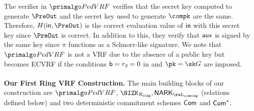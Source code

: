 %



The verifier in $ \PedVRF $ verifies that the secret key computed to generate $ \PreOut $ and the secret key used to generate $ \compk $ are the same. Therefore, $ H(\msg, \PreOut) $ is the correct evaluation value of $ \mathsf{in} $ with this secret key since $ \PreOut $ is correct. In addition to this, they verify that $ \mathsf{aux} $
is signed by the same key since $ \pi $ functions as a Schnorr-like signature. We note that $ \PedVRF $ is not a VRF due to the absence of a public key but becomes ECVRF \cite{nsec5,VXEd25519,draft-irtf-cfrg-vrf-10} if the conditions $\mathsf{b} = r_2 = 0$ in \Sign and $ \pk = \sk G $ are imposed.
\\\\
\textbf{Our First Ring VRF Construction.} The main building blocks of our construction are $ \PedVRF $, $ \NIZK_{\Rring}, \NARK_{\relcomring} $ (relations defined below) and two deterministic commitment schemes $ \mathsf{Com} $ and $ \mathsf{Com}^* $.


